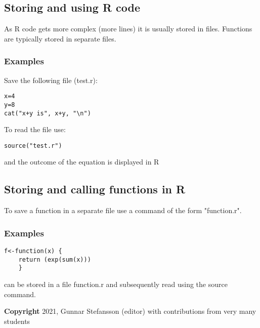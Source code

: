 \documentclass[12pt,a4paper]{article}
\theoremstyle{regla}
\theoremstyle{remark}
\theoremstyle{definition}
\theoremstyle{nonumberbreak}
\begin{document}
\subsection{Storing and using R code}
\begin{fbox}
\begin{minipage}{0.97\textwidth}
As R code gets more complex (more lines) it is usually stored in files. Functions are typically stored in separate files.
\end{minipage}
\end{fbox}
\subsubsection{Examples}
\begin{xmpl}
Save the following file (test.r):
\begin{lstlisting}
x=4
y=8
cat("x+y is", x+y, "\n")
\end{lstlisting}
To read the file use: 
\begin{lstlisting}
source("test.r")
\end{lstlisting}
and the outcome of the equation is displayed in R
\end{xmpl}

\subsection{Storing and calling functions in R}
\begin{fbox}
\begin{minipage}{0.97\textwidth}
To save a function in a separate file use a command of the form "function.r".
\end{minipage}
\end{fbox}
\subsubsection{Examples}
\begin{xmpl}

\begin{lstlisting}
f<-function(x) {
    return (exp(sum(x)))
    }
\end{lstlisting}
can be stored in a file function.r and
subsequently read using the source command.
\end{xmpl}

{\bf Copyright}
2021, Gunnar Stefansson (editor) with contributions from very many students
\end{document}

